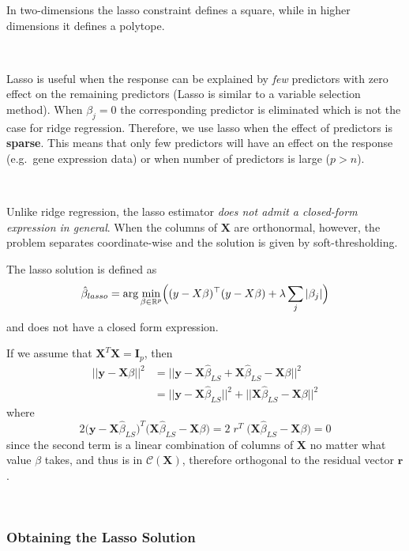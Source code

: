 \documentclass[
]{book}
\begin{document}
In two-dimensions the lasso constraint defines a square, while in higher dimensions it defines a polytope.

~

Lasso is useful when the response can be explained by \emph{few} predictors with zero effect on the remaining predictors (Lasso is similar to a variable selection method). When \(\beta_j=0\) the corresponding predictor is eliminated which is not the case for ridge regression. Therefore, we use lasso when the effect of predictors is \textbf{sparse}. This means that only few predictors will have an effect on the response (e.g.~gene expression data) or when number of predictors is large (\(p>n\)).

~

Unlike ridge regression, the lasso estimator \emph{does not admit a closed-form expression in general}. When the columns of \(\mathbf{X}\) are orthonormal, however, the problem separates coordinate-wise and the solution is given by soft-thresholding.

The lasso solution is defined as
\[\hat{\beta}_{lasso} = \arg \min_{\beta\in \mathbb{R}^{p}} \Bigl((y-X \beta)^\top(y-X\beta) + \lambda \sum_j |\beta_j| \Bigr)\]
and does not have a closed form expression.
~

If we assume that \(\mathbf{X}^T\mathbf{X} = \mathbf{I}_p\), then
\begin{align*}
||\mathbf{y} - \mathbf{X}\beta||^2 &= ||\mathbf{y} - \mathbf{X}\hat{\beta}_{LS} + \mathbf{X}\hat{\beta}_{LS} - \mathbf{X}\beta||^2\\
&=||\mathbf{y} - \mathbf{X}\hat{\beta}_{LS}||^2 + ||\mathbf{X}\hat{\beta}_{LS} - \mathbf{X}\beta||^2
\end{align*}
where
\[2  \bigl( \mathbf{y} - \mathbf{X}\hat{\beta}_{LS}\bigr)^T \bigl(  \mathbf{X}\hat{\beta}_{LS} - \mathbf{X}\beta \bigr) = 2 \; r^T \; \bigl(  \mathbf{X}\hat{\beta}_{LS} - \mathbf{X} \beta\bigr) =0\]
since the second term is a linear combination of columns of \(\mathbf{X}\) no matter what value \(\beta\) takes, and thus is in \(\mathcal{C}(\mathbf{X})\), therefore orthogonal to the residual vector \(\mathbf{r}\).

~

\subsubsection*{Obtaining the Lasso Solution}\label{obtaining-the-lasso-solution}
\end{document}

